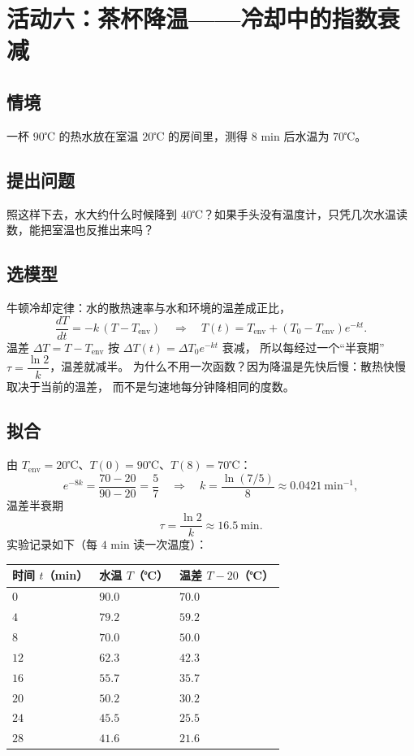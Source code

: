 
\section{活动六：茶杯降温——冷却中的指数衰减}

\subsection{情境}
一杯 $90$℃ 的热水放在室温 $20$℃ 的房间里，测得 $8$ min 后水温为 $70$℃。

\subsection{提出问题}
照这样下去，水大约什么时候降到 $40$℃？如果手头没有温度计，只凭几次水温读数，能把室温也反推出来吗？

\subsection{选模型}
牛顿冷却定律：水的散热速率与水和环境的温差成正比，
\[
  \frac{dT}{dt}=-k\,(T-T_{\text{env}})\quad\Longrightarrow\quad
  T(t)=T_{\text{env}}+(T_0-T_{\text{env}})e^{-kt}.
\]
温差 $\Delta T=T-T_{\text{env}}$ 按 $\Delta T(t)=\Delta T_0e^{-kt}$ 衰减，
所以每经过一个“半衰期” $\tau=\dfrac{\ln2}{k}$，温差就减半。
为什么不用一次函数？因为降温是先快后慢：散热快慢取决于当前的温差，
而不是匀速地每分钟降相同的度数。

\subsection{拟合}
由 $T_{\text{env}}=20$℃、$T(0)=90$℃、$T(8)=70$℃：
\[
  e^{-8k}=\frac{70-20}{90-20}=\frac{5}{7}
  \quad\Longrightarrow\quad
  k=\frac{\ln(7/5)}{8}\approx0.0421\ \mathrm{min}^{-1},
\]
温差半衰期
\[
  \tau=\frac{\ln2}{k}\approx16.5\ \mathrm{min}.
\]
实验记录如下（每 $4$ min 读一次温度）：

\begin{center}
\footnotesize
\setlength{\tabcolsep}{4pt}
\renewcommand{\arraystretch}{1.4}
\begin{tabular}{p{2.8cm}p{3.4cm}p{3.6cm}}
\toprule
时间 $t$（min） & 水温 $T$（℃） & 温差 $T-20$（℃） \\
\midrule
$0$ & $90.0$ & $70.0$ \\
$4$ & $79.2$ & $59.2$ \\
$8$ & $70.0$ & $50.0$ \\
$12$ & $62.3$ & $42.3$ \\
$16$ & $55.7$ & $35.7$ \\
$20$ & $50.2$ & $30.2$ \\
$24$ & $45.5$ & $25.5$ \\
$28$ & $41.6$ & $21.6$ \\
\bottomrule
\end{tabular}
\end{center}

